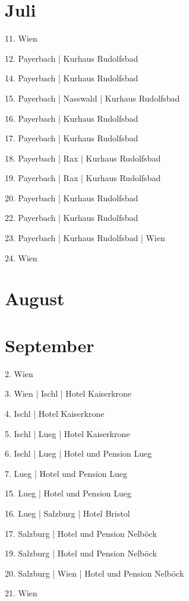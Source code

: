 \documentclass[twoside=false,titlepage=false,open=any, parskip=never, fontsize=10pt, headings=small, chapterprefix=false, appendixprefix=false, DIV=15]{scrbook}
\begin{document}
\begin{multicols}{3}
            \section*{Juli}
            11. Wien\par
            12. Payerbach | Kurhaus Rudolfsbad\par
            14. Payerbach | Kurhaus Rudolfsbad\par
            15. Payerbach | Nasswald | Kurhaus Rudolfsbad\par
            16. Payerbach | Kurhaus Rudolfsbad\par
            17. Payerbach | Kurhaus Rudolfsbad\par
            18. Payerbach | Rax | Kurhaus Rudolfsbad\par
            19. Payerbach | Rax | Kurhaus Rudolfsbad\par
            20. Payerbach | Kurhaus Rudolfsbad\par
            22. Payerbach | Kurhaus Rudolfsbad\par
            23. Payerbach | Kurhaus Rudolfsbad | Wien\par
            24. Wien\par
            \section*{August}
            \section*{September}
            2. Wien\par
            3. Wien | Ischl | Hotel Kaiserkrone\par
            4. Ischl | Hotel Kaiserkrone\par
            5. Ischl | Lueg | Hotel Kaiserkrone\par
            6. Ischl | Lueg | Hotel und Pension Lueg\par
            7. Lueg | Hotel und Pension Lueg\par
            15. Lueg | Hotel und Pension Lueg\par
            16. Lueg | Salzburg | Hotel Bristol\par
            17. Salzburg | Hotel und Pension Nelböck\par
            19. Salzburg | Hotel und Pension Nelböck\par
            20. Salzburg | Wien | Hotel und Pension Nelböck\par
            21. Wien\par

\end{multicols}
\end{document}
